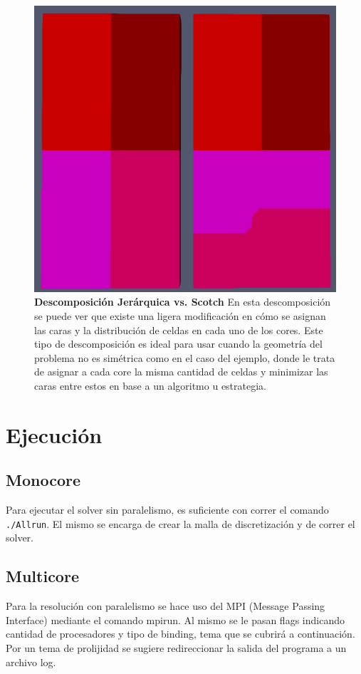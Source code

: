 \documentclass{article}
\begin{document}
\begin{figure}[H] 
    \centering
    \includegraphics[scale=0.5]{../res/imgs/image6.png}
    \caption{\textbf{Descomposición Jerárquica vs. Scotch} En esta descomposición se puede ver que existe una ligera modificación en cómo se asignan las caras y la distribución de celdas en cada uno de los cores. Este tipo de descomposición es ideal para usar cuando la geometría del problema no es simétrica como en el caso del ejemplo, donde le trata de asignar a cada core la misma cantidad de celdas y minimizar las caras entre estos en base a un algoritmo u estrategia.}
\end{figure}

\newpage
\section{Ejecución}
\subsection{Monocore}
Para ejecutar el solver sin paralelismo, es suficiente con correr el comando \texttt{./Allrun}. El mismo se encarga de crear la malla de discretización y de correr el solver.
\subsection{Multicore}
Para la resolución con paralelismo se hace uso del MPI (Message Passing Interface) mediante el comando mpirun. Al mismo se le pasan flags indicando cantidad de procesadores y tipo de binding, tema que se cubrirá a continuación. Por un tema de prolijidad se sugiere redireccionar la salida del programa a un archivo log.
\end{document}
